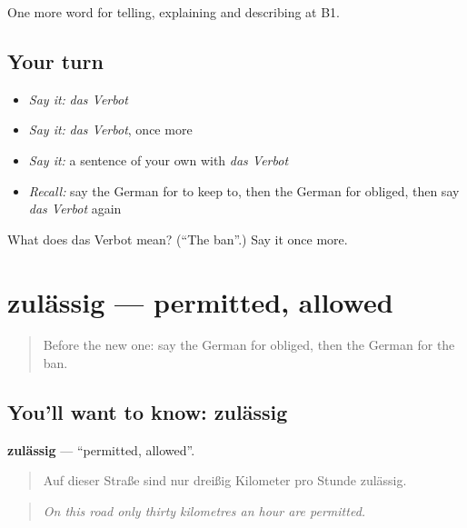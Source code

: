 \begin{grammarlens}[title={What you've built}]
One more word for telling, explaining and describing at B1.
\end{grammarlens}

\subsection*{Your turn}
\begin{itemize}
\raggedright
  \item \emph{Say it:} \emph{das Verbot}
  \item \emph{Say it:} \emph{das Verbot}, once more
  \item \emph{Say it:} a sentence of your own with \emph{das Verbot}
  \item \emph{Recall:} say the German for to keep to, then the German for obliged, then say \emph{das Verbot} again
\end{itemize}

\begin{tcolorbox}[breakable,colback=teal!4,colframe=teal!35!black,title={Before you move on}]
What does das Verbot mean? (\textquotedblleft{}The ban\textquotedblright{}.) Say it once more.
\end{tcolorbox}
\section[zulässig]{zulässig — permitted, allowed}

\label{lesson:GE-C382-zulaessig}



\begin{quote}
Before the new one: say the German for obliged, then the German for the ban.
\end{quote}

\subsection*{You'll want to know: zulässig}
\textbf{zulässig} — \textquotedblleft{}permitted, allowed\textquotedblright{}.

\begin{quote}
Auf dieser Straße sind nur dreißig Kilometer pro Stunde zulässig.
\end{quote}

\begin{quote}
\emph{On this road only thirty kilometres an hour are permitted.}
\end{quote}

